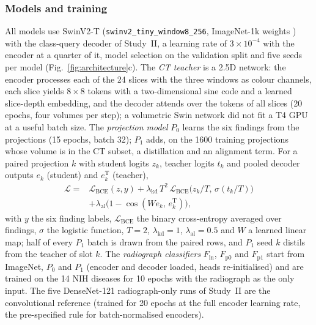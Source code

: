 \subsubsection{Models and training}
All models use SwinV2-T (\texttt{swinv2\_tiny\_window8\_256}, ImageNet-1k weights \cite{liu2022swinv2,wightman2019timm}) with the
class-query decoder of Study~II, a learning rate of $3\times10^{-4}$ with the encoder at a quarter of it, model selection on the validation
split and five seeds per model (Fig.~\ref{fig:architecture}c). The \emph{CT teacher} is a 2.5D network: the encoder processes each of the
24 slices with the three windows as colour channels, each slice yields $8\times8$ tokens with a two-dimensional sine code and a learned
slice-depth embedding, and the decoder attends over the tokens of all slices (20 epochs, four volumes per step); a volumetric Swin network
did not fit a T4 GPU at a useful batch size. The \emph{projection model} $P_0$ learns the six findings from the projections (15 epochs,
batch 32); $P_1$ adds, on the \num{1600} training projections whose volume is in the CT subset, a distillation and an alignment term. For a
paired projection $k$ with student logits $z_k$, teacher logits $t_k$ and pooled decoder outputs $e_k$ (student) and $e^{\mathrm{T}}_k$
(teacher),
\begin{equation}
\begin{split}
\mathcal{L}={}&\mathcal{L}_{\mathrm{BCE}}(z,y)+\lambda_{\mathrm{kd}}\,T^{2}\,\mathcal{L}_{\mathrm{BCE}}\!\big(z_k/T,\,\sigma(t_k/T)\big)\\
&+\lambda_{\mathrm{al}}\big(1-\cos(We_k,\,e^{\mathrm{T}}_k)\big),
\end{split}
\label{eq:kd}
\end{equation}
with $y$ the six finding labels, $\mathcal{L}_{\mathrm{BCE}}$ the binary cross-entropy averaged over findings, $\sigma$ the logistic
function, $T=2$, $\lambda_{\mathrm{kd}}=1$, $\lambda_{\mathrm{al}}=0.5$ and $W$ a learned linear map; half of every $P_1$ batch is drawn
from the paired rows, and $P_1$ seed $k$ distils from the teacher of slot $k$. The \emph{radiograph classifiers} $F_{\mathrm{in}}$,
$F_{\mathrm{p0}}$ and $F_{\mathrm{p1}}$ start from ImageNet, $P_0$ and $P_1$ (encoder and decoder loaded, heads re-initialised) and are
trained on the 14 NIH diseases for 10 epochs with the radiograph as the only input. The five DenseNet-121 radiograph-only runs of Study~II
are the convolutional reference (trained for 20 epochs at the full encoder learning rate, the pre-specified rule for batch-normalised
encoders).

